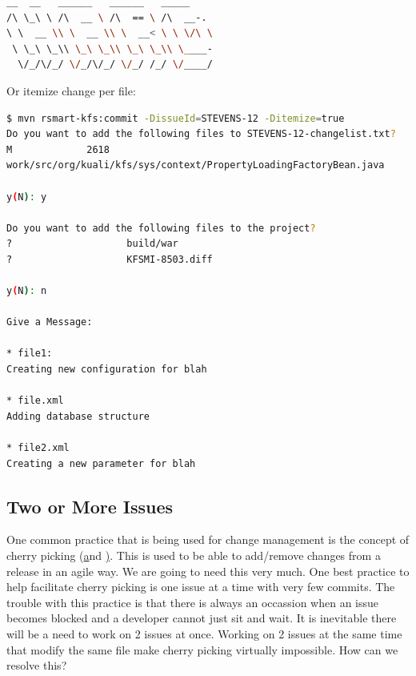 \documentclass[12pt,notitlepage]{article}
\begin{document}
\begin{lstlisting}[language=bash,caption={Commit a change to an issue}]
 __  __   ______   ______   _____                                 
/\ \_\ \ /\  __ \ /\  == \ /\  __-.                               
\ \  __ \\ \  __ \\ \  __< \ \ \/\ \                              
 \ \_\ \_\\ \_\ \_\\ \_\ \_\\ \____-                              
  \/_/\/_/ \/_/\/_/ \/_/ /_/ \/____/                              
\end{lstlisting}

Or itemize change per file:

\begin{lstlisting}[language=bash,caption={Commit a change to an issue}]
$ mvn rsmart-kfs:commit -DissueId=STEVENS-12 -Ditemize=true
Do you want to add the following files to STEVENS-12-changelist.txt?
M             2618
work/src/org/kuali/kfs/sys/context/PropertyLoadingFactoryBean.java

y(N): y

Do you want to add the following files to the project?
?                    build/war
?                    KFSMI-8503.diff

y(N): n

Give a Message:

* file1:
Creating new configuration for blah

* file.xml
Adding database structure

* file2.xml 
Creating a new parameter for blah

\end{lstlisting}

\subsection{Two or More Issues}

One common practice that is being used for change management is the
concept of cherry picking
(\href{http://svnbook.red-bean.com/en/1.7/svn.branchmerge.advanced.html}
and
\href{http://www.kernel.org/pub/software/scm/git/docs/git-cherry-pick.html}). This
is used to be able to add/remove changes from a release in an agile
way. We are going to need this very much. One best practice to help
facilitate cherry picking is one issue at a time with very few
commits. The trouble with this practice is that there is always an
occassion when an issue becomes blocked and a developer cannot just
sit and wait. It is inevitable there will be a need to work on 2
issues at once. Working on 2 issues at the same time that modify the
same file make cherry picking virtually impossible. How can we resolve
this?
\end{document}
